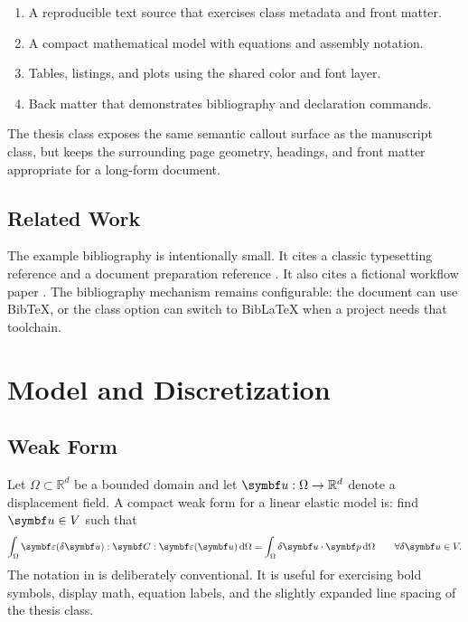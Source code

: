 \begin{enumerate}
  \item A reproducible text source that exercises class metadata and front
    matter.
  \item A compact mathematical model with equations and assembly notation.
  \item Tables, listings, and plots using the shared color and font layer.
  \item Back matter that demonstrates bibliography and declaration commands.
\end{enumerate}

\begin{oritonenote}
The thesis class exposes the same semantic callout surface as the manuscript
class, but keeps the surrounding page geometry, headings, and front matter
appropriate for a long-form document.
\end{oritonenote}

\section{Related Work}
\label{sec:related-work}

The example bibliography is intentionally small. It cites a classic typesetting
reference \cite{knuth1984texbook} and a document preparation reference
\cite{lamport1986latex}. It also cites a fictional workflow paper
\cite{sterling2025workflows}. The bibliography mechanism remains configurable:
the document can use BibTeX, or the class option can switch to BibLaTeX when a
project needs that toolchain.

\chapter{Model and Discretization}
\label{ch:model}

\section{Weak Form}
\label{sec:weak-form}

Let \(\Omega\subset\mathbb{R}^d\) be a bounded domain and let
\(\bs{u}:\Omega\to\mathbb{R}^d\) denote a displacement field. A compact weak
form for a linear elastic model is: find \(\bs{u}\in V\) such that
\begin{equation}
  \int_\Omega
    \bs{\varepsilon}(\delta\bs{u}) : \bs{C} :
    \bs{\varepsilon}(\bs{u})
  \intd{\Omega}
  =
  \int_\Omega
    \delta\bs{u}\cdot\bs{p}
  \intd{\Omega}
  \qquad \forall\delta\bs{u}\in V .
  \label{eq:weak-form}
\end{equation}
The notation in  is deliberately conventional. It is useful
for exercising bold symbols, display math, equation labels, and the slightly
expanded line spacing of the thesis class.


